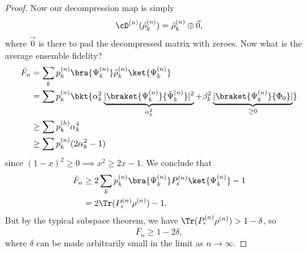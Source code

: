 \begin{proof}
    Now our decompression map is simply
    \begin{equation}
        \cD^{(n)}(\tilde \rho_k^{(n)}) = \tilde \rho_k^{(n)}\oplus \vec 0,
    \end{equation}
    where $\vec 0$ is there to pad the decompressed matrix with zeroes. Now what is the average ensemble fidelity?
    \begin{align*}
        \bar F_n &= \sum_k p_k^{(n)} \bra{\Psi_k^{(n)}} \tilde \rho_k^{(n)} \ket{\Psi_k^{(n)}}\\
        &= \sum p_k^{(n)} \bkt{ \alpha_k^2 \underbrace{|\braket{\Psi_k^{(n)}}{\tilde \Psi_k^{(n)}}|^2}_{\alpha_k^2}+\beta_k^2 \underbrace{|\braket{\Psi_k^{(n)}}{\Phi_0}|}_{\geq 0}}\\
        &\geq \sum p_k^{(h)} \alpha_k^4\\
        &\geq \sum p_k^{(n)}(2\alpha_k^2-1)
    \end{align*}
    since $(1-x)^2 \geq 0 \implies x^2 \geq 2x-1$. We conclude that
    \begin{align*}
        \bar F_n &\geq 2 \sum_k p_k^{(n)} \bra{\Psi_k^{(n)}}P_\epsilon^{(n)} \ket{\Psi_k^{(n)}} -1\\
        &= 2\Tr(P_\epsilon^{(n)} \rho^{(n)})-1.
    \end{align*}
    But by the typical subspace theorem, we have $\Tr(P_\epsilon^{(n)} \rho^{(n)}) > 1-\delta$, so
    \begin{equation}
        \bar F_n \geq 1-2\delta,
    \end{equation}
    where $\delta$ can be made arbitrarily small in the limit as $n\to \infty$.
\end{proof}
